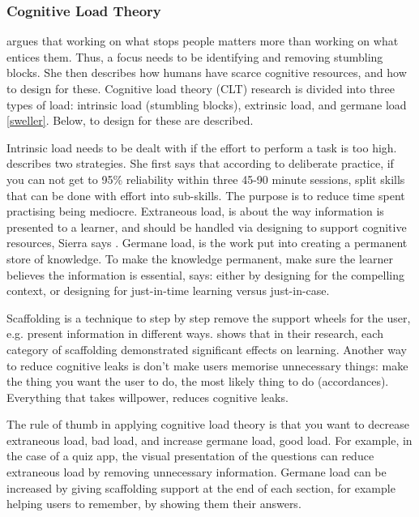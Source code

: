\subsubsection{Cognitive Load Theory}

\cite{sierra} argues that working on what stops people matters more than working on what entices them. Thus, a focus needs to be identifying and removing stumbling blocks. She then describes how humans have scarce cognitive resources, and how to design for these. Cognitive load theory (CLT) research is divided into three types of load: intrinsic load (stumbling blocks), extrinsic load, and germane load \ref{sweller}. Below, to design for these are described.

Intrinsic load needs to be dealt with if the effort to perform a task is too high. \cite{sierra} describes two strategies. She first says that according to deliberate practice, if you can not get to 95\% reliability within three 45-90 minute sessions, split skills that can be done with effort into sub-skills. The purpose is to reduce time spent practising being mediocre. Extraneous load, is about the way information is presented to a learner, and should be handled via designing to support cognitive resources, Sierra says \citep{sierra}. Germane load, is the work put into creating a permanent store of knowledge. To make the knowledge permanent, make sure the learner believes the information is essential, \cite{sierra} says: either by designing for the compelling context, or designing for just-in-time learning versus just-in-case.

Scaffolding is a technique to step by step remove the support wheels for the user, e.g. present information in different ways. \cite{gates} shows that in their research, each category of scaffolding demonstrated significant effects on learning. Another way to reduce cognitive leaks is don't make users memorise unnecessary things: make the thing you want the user to do, the most likely thing to do (accordances). Everything that takes willpower, reduces cognitive leaks.

The rule of thumb in applying cognitive load theory is that you want to decrease extraneous load, bad load, and increase germane load, good load. For example, in the case of a quiz app, the visual presentation of the questions can reduce extraneous load by removing unnecessary information. Germane load can be increased by giving scaffolding support at the end of each section, for example helping users to remember, by showing them their answers.

